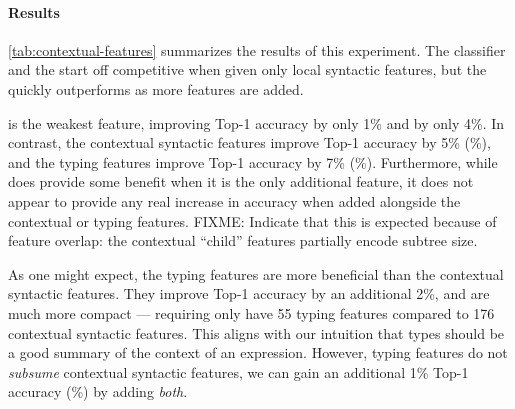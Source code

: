 \begin{table}[ht]
\begin{tabular}{lrcrrrrcrrrr}
    \bottomrule
  \end{tabular}
\end{table}
%
\paragraph{Results}
\autoref{tab:contextual-features} summarizes the results of this experiment.
%
The \linear classifier and the \hiddenFH start off
competitive when given only local syntactic features, but the \hiddenFH
quickly outperforms as more features are added.

\ExprSize is the weakest feature, improving \linear Top-1
accuracy by only 1\% and \hiddenFH by only 4\%.
%
In contrast, the contextual syntactic features improve \linear Top-1
accuracy by 5\% (\%), and the typing features improve
Top-1 accuracy by 7\% (\%).
%
Furthermore, while \ExprSize does provide some benefit when it is the
only additional feature, it does not appear to provide any real increase
in accuracy when added alongside the contextual or typing features.
FIXME: Indicate that this is expected because of feature overlap: the
contextual ``child'' features partially encode subtree size.

As one might expect, the typing features are more beneficial than the
contextual syntactic features.
%
They improve Top-1 accuracy by an additional 2\%, and are much more
compact --- requiring only have 55 typing features compared to 176
contextual syntactic features.
%
This aligns with our intuition that types should be a good summary of
the context of an expression.
%
However, typing features do not \emph{subsume} contextual syntactic
features, we can gain an additional 1\% Top-1 accuracy (\%) by
adding \emph{both}.
